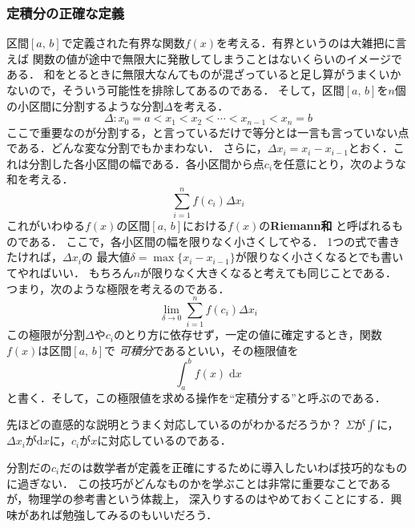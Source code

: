 \subsubsection{定積分の正確な定義}
区間$[a, \, b]$で定義された有界な関数$f(x)$を考える．有界というのは大雑把に言えば
関数の値が途中で無限大に発散してしまうことはないくらいのイメージである．
和をとるときに無限大なんてものが混ざっていると足し算がうまくいかないので，そういう可能性を排除してあるのである．
そして，区間$[a, \, b]$を$n$個の小区間に分割するような分割$\varDelta$を考える．
\begin{equation*}
\varDelta : x_0 = a < x_1 < x_2 < \cdots < x_{n-1} < x_n =b
\end{equation*}
ここで重要なのが分割する，と言っているだけで等分とは一言も言っていない点である．どんな変な分割でもかまわない．
さらに，$\varDelta x_i = x_i - x_{i-1}$とおく．これは分割した各小区間の幅である．各小区間から点$c_i$を任意にとり，次のような和を考える．
\begin{equation*}
\sum_{i=1}^{n} f(c_i) \varDelta x_i
\label{riemannwa}
\end{equation*}
これがいわゆる$f(x)$の区間$[a, \, b]$における$f(x)$の\textbf{Riemann和}
と呼ばれるものである．
ここで，各小区間の幅を限りなく小さくしてやる．
1つの式で書きたければ，$\varDelta x_i$の
最大値$\delta = \max \{ x_i-x_{i-1} \} $が限りなく小さくなるとでも書いてやればいい．
もちろん$n$が限りなく大きくなると考えても同じことである．
つまり，次のような極限を考えるのである．
\begin{equation*}
\lim_{\delta \to 0} \sum_{i=1}^{n} f(c_i) \varDelta x_i
\end{equation*}
この極限が分割$\varDelta$や$c_i$のとり方に依存せず，一定の値に確定するとき，関数$f(x)$は区間$[a, \, b]$で
\emph{可積分}であるといい，その極限値を
\begin{equation*}
\int_a^b f(x) \; \mathrm{d}x
\end{equation*}
と書く．そして，この極限値を求める操作を``定積分する''と呼ぶのである．

先ほどの直感的な説明とうまく対応しているのがわかるだろうか？ $\Sigma$が$\int$に，
$\varDelta x_i$が$\mathrm{d}x$に，$c_i$が$x$に対応しているのである．

分割だの$c_i$だのは数学者が定義を正確にするために導入したいわば技巧的なものに過ぎない．
この技巧がどんなものかを学ぶことは非常に重要なことであるが，物理学の参考書という体裁上，
深入りするのはやめておくことにする．興味があれば勉強してみるのもいいだろう．

